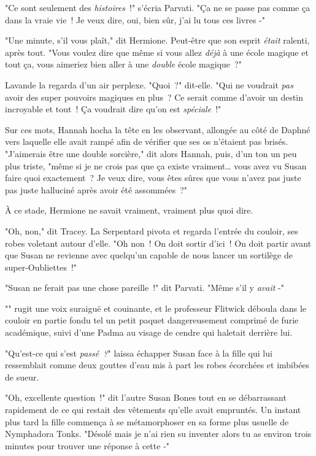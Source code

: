 "Ce sont seulement des \emph{histoires}~!" s'écria Parvati. "Ça ne se passe pas comme ça dans la vraie vie~! Je veux dire, oui, bien sûr, j'ai lu tous ces livres -"

"Une minute, s'il vous plaît," dit Hermione. Peut-être que son esprit \emph{était} ralenti, après tout. "Vous voulez dire que même si vous allez \emph{déjà} à une école magique et tout ça, vous aimeriez bien aller à une \emph{double} école magique~?"

Lavande la regarda d'un air perplexe. "Quoi~?" dit-elle. "Qui ne voudrait \emph{pas} avoir des super pouvoirs magiques en plus~? Ce serait comme d'avoir un destin incroyable et tout~! Ça voudrait dire qu'on est \emph{spéciale}~!"

Sur ces mots, Hannah hocha la tête en les observant, allongée au côté de Daphné vers laquelle elle avait rampé afin de vérifier que ses os n'étaient pas brisés. "J'aimerais être une double sorcière," dit alors Hannah, puis, d'un ton un peu plus triste, "même si je ne crois pas que ça existe vraiment… vous avez vu Susan faire quoi exactement~? Je veux dire, vous êtes sûres que vous n'avez pas juste pas juste halluciné après avoir été assommées~?"

À ce stade, Hermione ne savait vraiment, vraiment plus quoi dire.

"Oh, non," dit Tracey. La Serpentard pivota et regarda l'entrée du couloir, ses robes voletant autour d'elle. "Oh non~! On doit sortir d'ici~! On doit partir avant que Susan ne revienne avec quelqu'un capable de nous lancer un sortilège de super-Oubliettes~!"

"Susan ne ferait pas une chose pareille~!" dit Parvati. "Même s'il y \emph{avait} -"

"" rugit une voix suraiguë et couinante, et le professeur Flitwick déboula dans le couloir en partie fondu tel un petit paquet dangereusement comprimé de furie académique, suivi d'une Padma au visage de cendre qui haletait derrière lui.

\later

"Qu'est-ce qui s'est \emph{passé~?}" laissa échapper Susan face à la fille qui lui ressemblait comme deux gouttes d'eau mis à part les robes écorchées et imbibées de sueur.

"Oh, excellente question~!" dit l'autre Susan Bones tout en se débarrassant rapidement de ce qui restait des vêtements qu'elle avait empruntés. Un instant plus tard la fille commença à se métamorphoser en sa forme plus usuelle de Nymphadora Tonks. "Désolé mais je n'ai rien su inventer alors tu as environ trois minutes pour trouver une réponse à cette -"

